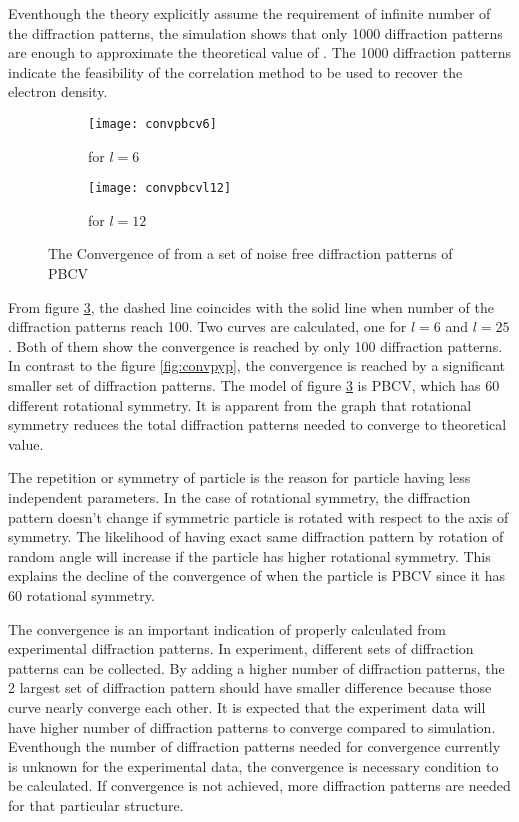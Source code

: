 Eventhough the theory explicitly assume the requirement of infinite number of the diffraction patterns, the simulation shows that only 1000 diffraction patterns are enough to approximate the theoretical value of \Blq. The 1000 diffraction patterns indicate the feasibility of the correlation method to be used to recover the electron density.
\begin{figure}[h]
\begin{subfigure}{.5\textwidth}
  \centering
  \texttt{[image: convpbcv6]}
  \caption{\Blq for $l=6$}
  \label{fig:sub1}
\end{subfigure}
\begin{subfigure}{.5\textwidth}
  \centering
  \texttt{[image: convpbcvl12]}
  \caption{\Blq for $l=12$}
  \label{fig:sub2}
\end{subfigure}
\caption{The Convergence of \Blq from a set of noise free diffraction patterns of PBCV}
\label{fig:convpbcv}
\end{figure}

From figure \ref{fig:convpbcv}, the dashed line coincides with the solid line when number of the diffraction patterns reach 100. Two \Blq curves are calculated, one for $l=6$ and $l=25$. Both of them show the convergence is reached by only 100 diffraction patterns. In contrast to the figure \ref{fig:convpyp}, the convergence is reached by a significant smaller set of diffraction patterns. The model of figure \ref{fig:convpbcv} is PBCV, which has 60 different rotational symmetry. It is apparent from the graph that rotational symmetry reduces the total diffraction patterns needed to converge to theoretical value.     

The repetition or symmetry of particle is the reason for particle having less independent parameters. In the case of rotational symmetry, the diffraction pattern doesn't change if symmetric particle is rotated with respect to the axis of symmetry. The likelihood of having exact same diffraction pattern by rotation of random angle will increase if the particle has higher rotational symmetry. This explains the decline of the convergence of \Blq when the particle is PBCV since it has 60 rotational symmetry. 

The convergence is an important indication of properly calculated \Blq from experimental diffraction patterns. In experiment, different sets of diffraction patterns can be collected. By adding a higher number of diffraction patterns, the 2 largest set of diffraction pattern should have smaller difference because those curve nearly converge each other. It is expected that the experiment data will have higher number of diffraction patterns to converge compared to simulation. Eventhough the number of diffraction patterns needed for convergence currently is unknown for the experimental data, the convergence is necessary condition to be calculated. If convergence is not achieved, more diffraction patterns are needed for that particular structure.      

